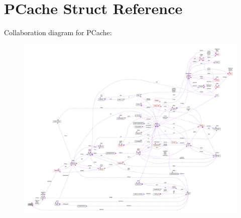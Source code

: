\hypertarget{struct_p_cache}{\section{P\-Cache Struct Reference}
\label{struct_p_cache}
}


Collaboration diagram for P\-Cache\-:\nopagebreak
\begin{figure}[H]
\begin{center}
\leavevmode
\includegraphics[width=350pt]{struct_p_cache__coll__graph}
\end{center}
\end{figure}
